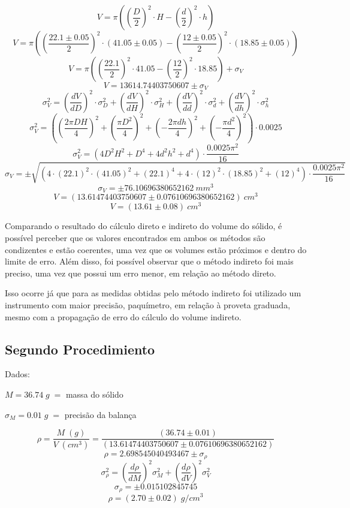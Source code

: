\documentclass{article}
\begin{document}
\[V = \pi \left(\left(\frac{D}{2}\right)^2\cdot H-\left(\frac{d}{2}\right)^2\cdot h\right)\]
\[V = \pi \left(\left(\frac{22.1\pm0.05}{2}\right)^2\cdot \left(41.05\pm0.05\right)-\left(\frac{12\pm0.05}{2}\right)^2\cdot \left(18.85\pm0.05\right)\right)\]
\[V = \pi \left(\left(\frac{22.1}{2}\right)^2\cdot 41.05-\left(\frac{12}{2}\right)^2\cdot 18.85\right)+\sigma_V\]
\[V = 13614.74403750607\pm\sigma_V\]
\vline
\[\sigma_V^2=\left(\frac{dV}{dD}\right)^2\cdot\sigma_D^2+\left(\frac{dV}{dH}\right)^2\cdot\sigma_H^2+\left(\frac{dV}{dd}\right)^2\cdot\sigma_d^2+\left(\frac{dV}{dh}\right)^2\cdot\sigma_h^2\]
\[\sigma_V^2=\left(\left(\frac{2\pi DH}{4}\right)^2+\left(\frac{\pi D^2}{4}\right)^2+\left(-\frac{2\pi dh}{4}\right)^2+\left(-\frac{\pi d^2}{4}\right)^2\right)\cdot0.0025\]
\[\sigma_V^2=\left(4D^2H^2+D^4+4d^2h^2+d^4\right)\cdot\frac{0.0025\pi^2}{16}\]
\[\sigma_V=\pm\sqrt{\left(4\cdot\left(22.1\right)^2\cdot\left(41.05\right)^2+\left(22.1\right)^4+4\cdot\left(12\right)^2\cdot\left(18.85\right)^2+\left(12\right)^4\right)\cdot\frac{0.0025\pi^2}{16}}\]
\[\sigma_V=\pm76.10696380652162\:mm^3\]
\[V = (13.61474403750607\pm0.07610696380652162)\:cm^3\]
\[V = (13.61\pm0.08)\:cm^3\]

Comparando o resultado do cálculo direto e indireto do volume do sólido, é possível perceber que os valores encontrados em ambos os métodos são condizentes e estão coerentes, uma vez que os volumes estão próximos e dentro do limite de erro. Além disso, foi possível observar que o método indireto foi mais preciso, uma vez que possui um erro menor, em relação ao método direto.

Isso ocorre já que para as medidas obtidas pelo método indireto foi utilizado um instrumento com maior precisão, paquímetro, em relação à proveta graduada, mesmo com a propagação de erro do cálculo do volume indireto.


\subsection{Segundo Procedimiento}
Dados:

$M = 36.74\;g\; = $ massa do sólido

$\sigma_M = 0.01\;g\; = $ precisão da balança

\[\rho = \frac{M\;(g)}{V\;(cm^3)} = \frac{(36.74\pm0.01)}{(13.61474403750607\pm0.07610696380652162)}\]
\[\rho = 2.698545040493467 \pm \sigma_\rho\]
\[\sigma_\rho^2 = \left(\frac{d\rho}{dM}\right)^2\sigma_M^2+\left(\frac{d\rho}{dV}\right)^2\sigma_V^2\]
\[\sigma_\rho =\pm 0.015102845745\]
\[\rho = (2.70 \pm 0.02)\;g/cm^3\]
\end{document}
